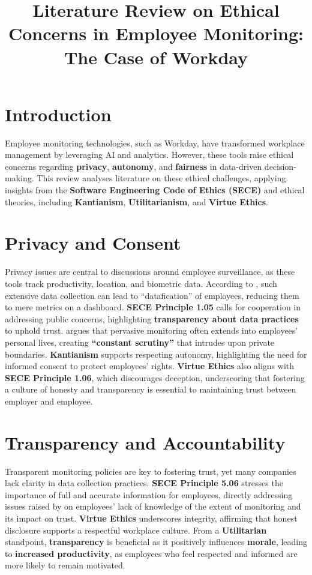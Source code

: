 \documentclass[a4paper, 11pt]{article}
\title{\textbf{Literature Review on Ethical Concerns in Employee Monitoring: The Case of Workday}}
\author{} %
\date{} %
\begin{document}
\maketitle
\thispagestyle{fancy}
\pagestyle{fancy}
\section*{Introduction}
Employee monitoring technologies, such as Workday, have transformed workplace management by leveraging AI and analytics. However, these tools raise ethical concerns regarding \textbf{privacy}, \textbf{autonomy}, and \textbf{fairness} in data-driven decision-making. This review analyses literature on these ethical challenges, applying insights from the \textbf{Software Engineering Code of Ethics (SECE)} and ethical theories, including \textbf{Kantianism}, \textbf{Utilitarianism}, and \textbf{Virtue Ethics}.

\section*{Privacy and Consent}
Privacy issues are central to discussions around employee surveillance, as these tools track productivity, location, and biometric data. According to \citet{Moore2018}, such extensive data collection can lead to “datafication” of employees, reducing them to mere metrics on a dashboard. \textbf{SECE Principle 1.05} calls for cooperation in addressing public concerns, highlighting \textbf{transparency about data practices} to uphold trust. \citet{Ajunwa2017} argues that pervasive monitoring often extends into employees' personal lives, creating \textbf{“constant scrutiny”} that intrudes upon private boundaries. \textbf{Kantianism} supports respecting autonomy, highlighting the need for informed consent to protect employees’ rights. \textbf{Virtue Ethics} also aligns with \textbf{SECE Principle 1.06}, which discourages deception, underscoring that fostering a culture of honesty and transparency is essential to maintaining trust between employer and employee.

\section*{Transparency and Accountability}
Transparent monitoring policies are key to fostering trust, yet many companies lack clarity in data collection practices. \textbf{SECE Principle 5.06} stresses the importance of full and accurate information for employees, directly addressing issues raised by \citet{Alge2006} on employees’ lack of knowledge of the extent of monitoring and its impact on trust. \textbf{Virtue Ethics} underscores integrity, affirming that honest disclosure supports a respectful workplace culture. From a \textbf{Utilitarian} standpoint, \textbf{transparency} is beneficial as it positively influences \textbf{morale}, leading to \textbf{increased productivity}, as employees who feel respected and informed are more likely to remain motivated.
\end{document}

